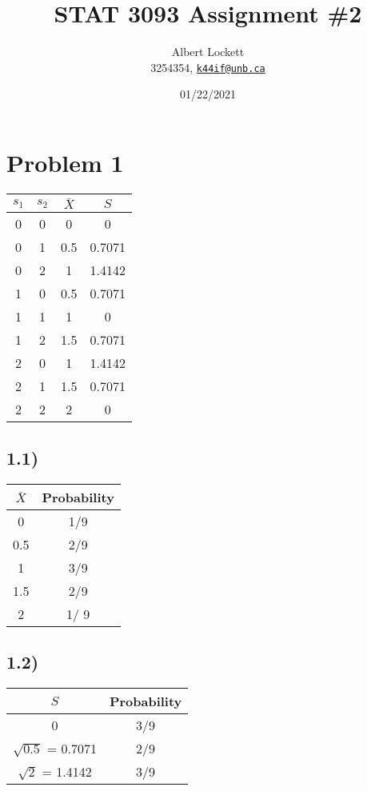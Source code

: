 \documentclass[a4paper,11pt]{article}
\begin{document}
\title{STAT 3093 Assignment \#2}
\author{
  Albert Lockett \\ 
  3254354, 
  \href{mailto:me@somewhere.com}{\texttt{k44if@unb.ca}}
  }
\date{01/22/2021}

\section*{Problem 1}

\begin{table}[htbp]
  \begin{tabularx}{\textwidth}{cccc}
    {\bf $s_1$} & {\bf $s_2$} & {\bf $\bar{X}$} & {\bf $S$} \\ \hline
    0 & 0 &     0      & 0      \\ 
    0 & 1 &    0.5     & 0.7071 \\ 
    0 & 2 &     1      & 1.4142 \\ 
    1 & 0 &    0.5     & 0.7071 \\ 
    1 & 1 &     1      & 0      \\ 
    1 & 2 &    1.5     & 0.7071 \\ 
    2 & 0 &     1      & 1.4142 \\ 
    2 & 1 &    1.5     & 0.7071 \\ 
    2 & 2 &     2      & 0          
  \end{tabularx}
\end{table}

\subsection*{1.1)}

\begin{table}[htbp]
  \begin{tabularx}{\textwidth}{cc}
    {\bf $\bar{X}$} & Probability \\ \hline
    0 & 1/9 \\ 
    0.5 & 2/9 \\
    1 &  3/9 \\
    1.5 & 2/9 \\
    2 & 1/ 9\\
  \end{tabularx}
\end{table}

\subsection*{1.2)}

\begin{table}[htbp]
  \begin{tabularx}{\textwidth}{cc}
    {\bf $S$} & Probability \\ \hline
    0 & 3/9 \\ 
    $\sqrt{0.5}$ = 0.7071 & 2/9 \\
    $\sqrt{2}$ = 1.4142 &  3/9 \\
  \end{tabularx}
\end{table}
\end{document}
